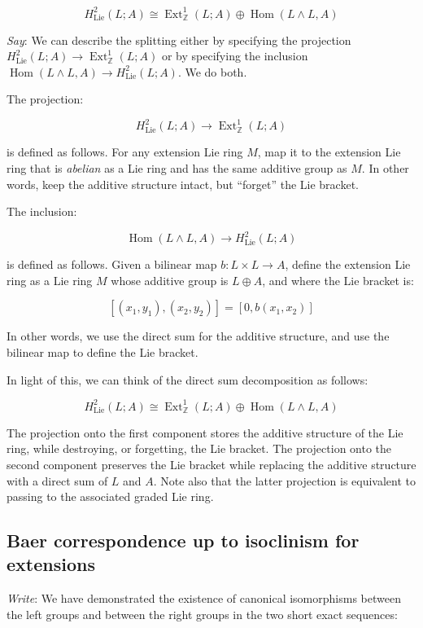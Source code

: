 \documentclass[10pt]{amsart}
\begin{document}
$$H^2_{\text{Lie}}(L;A) \cong \operatorname{Ext}^1_{\mathbb{Z}}(L;A) \oplus \operatorname{Hom}(L \wedge L,A)$$

{\em Say}: We can describe the splitting either by specifying the projection
$H^2_{\text{Lie}}(L;A) \to \operatorname{Ext}^1_{\mathbb{Z}}(L;A)$ or by specifying
the inclusion $\operatorname{Hom}(L \wedge L,A) \to H^2_{\text{Lie}}(L;A)$. We do both.

The projection:

$$H^2_{\text{Lie}}(L;A) \to \operatorname{Ext}^1_{\mathbb{Z}}(L;A)$$

is defined as follows. For any extension Lie ring $M$, map it to the
extension Lie ring that is {\em abelian} as a Lie ring and has the
same additive group as $M$. In other words, keep the additive
structure intact, but ``forget'' the Lie bracket.

The inclusion:

$$\operatorname{Hom}(L \wedge L,A) \to H^2_{\text{Lie}}(L;A)$$

is defined as follows. Given a bilinear map $b:L \times L \to A$,
define the extension Lie ring as a Lie ring $M$ whose additive group
is $L \oplus A$, and where the Lie bracket is:

$$[(x_1,y_1),(x_2,y_2)] = [0,b(x_1,x_2)]$$

In other words, we use the direct sum for the additive structure, and
use the bilinear map to define the Lie bracket.

In light of this, we can think of the direct sum decomposition as follows:

$$H^2_{\text{Lie}}(L;A) \cong \operatorname{Ext}^1_{\mathbb{Z}}(L;A) \oplus \operatorname{Hom}(L \wedge L,A)$$

The projection onto the first component stores the additive structure
of the Lie ring, while destroying, or forgetting, the Lie bracket. The
projection onto the second component preserves the Lie bracket while
replacing the additive structure with a direct sum of $L$ and
$A$. Note also that the latter projection is equivalent to passing to
the associated graded Lie ring.%

\subsection{Baer correspondence up to isoclinism for extensions}

{\em Write}: We have demonstrated the existence of canonical
isomorphisms between the left groups and between the right groups in
the two short exact sequences:
\end{document}
